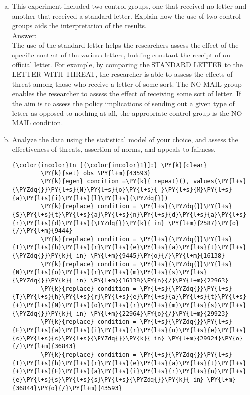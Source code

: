\documentclass[11pt,notitlepage]{article}\usepackage[]{graphicx}\usepackage[]{color}
\makeatletter
\newenvironment{kframe}{%
 \def\at@end@of@kframe{}%
 \ifinner\ifhmode%
  \def\at@end@of@kframe{\end{minipage}}%
  \begin{minipage}{\columnwidth}%
 \fi\fi%
 \def\FrameCommand##1{\hskip\@totalleftmargin \hskip-\fboxsep
 \colorbox{shadecolor}{##1}\hskip-\fboxsep
     \hskip-\linewidth \hskip-\@totalleftmargin \hskip\columnwidth}%
 \MakeFramed {\advance\hsize-\width
   \@totalleftmargin\z@ \linewidth\hsize
   \@setminipage}}%
 {\par\unskip\endMakeFramed%
 \at@end@of@kframe}
\newenvironment{knitrout}{}{} %
\makeatother
\begin{document}
\begin{enumerate}[a)]
\item This experiment included two control groups, one that received no letter and another that received a standard letter. Explain how the use of two control groups aids the interpretation of the results. \\
Answer:\\

The use of the standard letter helps the researchers assess the effect of the specific content of the various letters, holding constant the receipt of an official letter. For example, by comparing the STANDARD LETTER to the LETTER WITH THREAT, the researcher is able to assess the effects of threat among those who receive a letter of some sort. The NO MAIL group enables the researcher to assess the effect of receiving some sort of letter. If the aim is to assess the policy implications of sending out a given type of letter as opposed to nothing at all, the appropriate control group is the NO MAIL condition.   

\item Analyze the data using the statistical model of your choice, and assess the effectiveness of threats, assertion of norms, and appeals to fairness.\\

\begin{knitrout}
\color{fgcolor}\begin{kframe}
    \begin{Verbatim}[commandchars=\\\{\}]
{\color{incolor}In [{\color{incolor}1}]:} \PY{k}{clear}
        \PY{k}{set} obs \PY{l+m}{43593}
        \PY{k}{egen} condition =\PY{k}{ repeat}(), values(\PY{l+s}{\PYZdq{}}\PY{l+s}{N}\PY{l+s}{o}\PY{l+s}{ }\PY{l+s}{M}\PY{l+s}{a}\PY{l+s}{i}\PY{l+s}{l}\PY{l+s}{\PYZdq{}})
        \PY{k}{replace} condition = \PY{l+s}{\PYZdq{}}\PY{l+s}{S}\PY{l+s}{t}\PY{l+s}{a}\PY{l+s}{n}\PY{l+s}{d}\PY{l+s}{a}\PY{l+s}{r}\PY{l+s}{d}\PY{l+s}{\PYZdq{}}\PY{k}{ in} \PY{l+m}{2587}\PY{o}{/}\PY{l+m}{9444}
        \PY{k}{replace} condition = \PY{l+s}{\PYZdq{}}\PY{l+s}{T}\PY{l+s}{h}\PY{l+s}{r}\PY{l+s}{e}\PY{l+s}{a}\PY{l+s}{t}\PY{l+s}{\PYZdq{}}\PY{k}{ in} \PY{l+m}{9445}\PY{o}{/}\PY{l+m}{16138}
        \PY{k}{replace} condition = \PY{l+s}{\PYZdq{}}\PY{l+s}{N}\PY{l+s}{o}\PY{l+s}{r}\PY{l+s}{m}\PY{l+s}{s}\PY{l+s}{\PYZdq{}}\PY{k}{ in} \PY{l+m}{16139}\PY{o}{/}\PY{l+m}{22963}
        \PY{k}{replace} condition = \PY{l+s}{\PYZdq{}}\PY{l+s}{T}\PY{l+s}{h}\PY{l+s}{r}\PY{l+s}{e}\PY{l+s}{a}\PY{l+s}{t}\PY{l+s}{+}\PY{l+s}{N}\PY{l+s}{o}\PY{l+s}{r}\PY{l+s}{m}\PY{l+s}{s}\PY{l+s}{\PYZdq{}}\PY{k}{ in} \PY{l+m}{22964}\PY{o}{/}\PY{l+m}{29923}
        \PY{k}{replace} condition = \PY{l+s}{\PYZdq{}}\PY{l+s}{F}\PY{l+s}{a}\PY{l+s}{i}\PY{l+s}{r}\PY{l+s}{n}\PY{l+s}{e}\PY{l+s}{s}\PY{l+s}{s}\PY{l+s}{\PYZdq{}}\PY{k}{ in} \PY{l+m}{29924}\PY{o}{/}\PY{l+m}{36843}
        \PY{k}{replace} condition = \PY{l+s}{\PYZdq{}}\PY{l+s}{T}\PY{l+s}{h}\PY{l+s}{r}\PY{l+s}{e}\PY{l+s}{a}\PY{l+s}{t}\PY{l+s}{+}\PY{l+s}{F}\PY{l+s}{a}\PY{l+s}{i}\PY{l+s}{r}\PY{l+s}{n}\PY{l+s}{e}\PY{l+s}{s}\PY{l+s}{s}\PY{l+s}{\PYZdq{}}\PY{k}{ in} \PY{l+m}{36844}\PY{o}{/}\PY{l+m}{43593}
        

\end{Verbatim}
\end{kframe}
\end{knitrout}
\end{enumerate}
\end{document}
